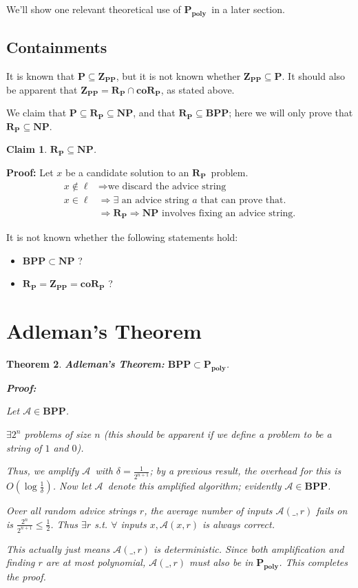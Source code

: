 \documentclass[11pt]{article}
\newcommand{\Pt}{\ensuremath{\mathbf{P}}}
\newcommand{\NP}{\ensuremath{\mathbf{NP}}}
\newcommand{\BPP}{\ensuremath{\mathbf{BPP}}}
\newcommand{\ZPP}{\ensuremath{\mathbf{Z_{PP}}}}
\newcommand{\RP}{\ensuremath{\mathbf{R_{P}}}}
\newcommand{\coRP}{\ensuremath{\mathbf{coR_{P}}}}
\newcommand{\Ppoly}{\ensuremath{\mathbf{P_{poly}}}}
\newcommand{\Alg}{\ensuremath{\mathcal{A}}}
\newtheorem{theorem}{Theorem}
\newtheorem{claim}[theorem]{Claim}
\begin{document}
We'll show one relevant theoretical use of \Ppoly\ in a later section.

\subsection{Containments}

It is known that $\Pt\subseteq\ZPP$, but it is not known whether $\ZPP\subseteq\Pt$.
It should also be apparent that $\ZPP = \RP\cap\coRP$, as stated above.

We claim that $\Pt\subseteq\RP\subseteq\NP$, and that $\RP\subseteq\BPP$; here we will only prove that $\RP\subseteq\NP$.

\begin{claim}
$\RP \subseteq \NP$.
\end{claim}
\textbf{Proof:} Let $x$ be a candidate solution to an \RP\ problem.
\begin{align*}
  x\notin\ell &\Rightarrow \text{we discard the advice string}\\
  x\in\ell &\Rightarrow \exists\text{ an advice string $a$ that can prove that.}\\
  &\Rightarrow \RP \Rightarrow \NP \text{ involves fixing an advice string.}
\end{align*}

It is not known whether the following statements hold:

\begin{itemize}
  \item $\BPP\subset\NP$ ?
  \item $\RP=\ZPP=\coRP$ ?
\end{itemize}

\section{Adleman's Theorem}

\begin{theorem}
\textbf{Adleman's Theorem:} $\BPP\subset\Ppoly$.

\textbf{Proof:}

Let $\Alg\in\BPP$.

$\exists 2^n$ problems of size $n$ (this should be apparent if we define a problem to be a string of $1$ and $0$).

Thus, we amplify \Alg\ with $\delta = \frac{1}{2^{n+1}}$; by a previous result, the overhead for this is $O(\log{\frac{1}{\delta}})$. Now let \Alg\ denote this amplified algorithm; evidently $\Alg\in\BPP$.

Over all random advice strings $r$, the average number of inputs $\Alg(\_, r)$ fails on is $\frac{2^n}{2^{n+1}} \leq \frac{1}{2}$. Thus $\exists r$ s.t. $\forall$ inputs $x, \Alg(x, r)$ is always correct.

This actually just means $\Alg(\_, r)$ is deterministic. Since both amplification and finding $r$ are at most polynomial, $\Alg(\_, r)$ must also be in \Ppoly. This completes the proof.
\end{theorem}
\end{document}
